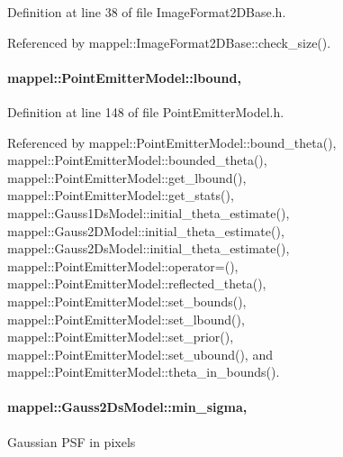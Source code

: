Definition at line 38 of file Image\+Format2\+D\+Base.\+h.



Referenced by mappel\+::\+Image\+Format2\+D\+Base\+::check\+\_\+size().

\paragraph[{\texorpdfstring{lbound}{lbound}}]{ mappel\+::\+Point\+Emitter\+Model\+::lbound\hspace{0.3cm}{\ttfamily [protected]}, {\ttfamily [inherited]}}\hypertarget{classmappel_1_1PointEmitterModel_a889bc82f74cfa654da121e5770296ab2}{}\label{classmappel_1_1PointEmitterModel_a889bc82f74cfa654da121e5770296ab2}


Definition at line 148 of file Point\+Emitter\+Model.\+h.



Referenced by mappel\+::\+Point\+Emitter\+Model\+::bound\+\_\+theta(), mappel\+::\+Point\+Emitter\+Model\+::bounded\+\_\+theta(), mappel\+::\+Point\+Emitter\+Model\+::get\+\_\+lbound(), mappel\+::\+Point\+Emitter\+Model\+::get\+\_\+stats(), mappel\+::\+Gauss1\+Ds\+Model\+::initial\+\_\+theta\+\_\+estimate(), mappel\+::\+Gauss2\+D\+Model\+::initial\+\_\+theta\+\_\+estimate(), mappel\+::\+Gauss2\+Ds\+Model\+::initial\+\_\+theta\+\_\+estimate(), mappel\+::\+Point\+Emitter\+Model\+::operator=(), mappel\+::\+Point\+Emitter\+Model\+::reflected\+\_\+theta(), mappel\+::\+Point\+Emitter\+Model\+::set\+\_\+bounds(), mappel\+::\+Point\+Emitter\+Model\+::set\+\_\+lbound(), mappel\+::\+Point\+Emitter\+Model\+::set\+\_\+prior(), mappel\+::\+Point\+Emitter\+Model\+::set\+\_\+ubound(), and mappel\+::\+Point\+Emitter\+Model\+::theta\+\_\+in\+\_\+bounds().

\paragraph[{\texorpdfstring{min\+\_\+sigma}{min_sigma}}]{ mappel\+::\+Gauss2\+Ds\+Model\+::min\+\_\+sigma\hspace{0.3cm}{\ttfamily [protected]}, {\ttfamily [inherited]}}\hypertarget{classmappel_1_1Gauss2DsModel_a8a97d37d210c1d161e4bc32c3a7b20dc}{}\label{classmappel_1_1Gauss2DsModel_a8a97d37d210c1d161e4bc32c3a7b20dc}
Gaussian P\+SF in pixels 

